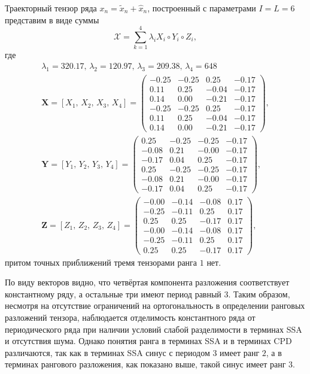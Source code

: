 \documentclass[specialist,
    substylefile = spbu_report.rtx,
    subf,href,colorlinks=true, 12pt]{disser}
\theoremstyle{plain}
\theoremstyle{definition}
\theoremstyle{remark}
\begin{document}
    Траекторный тензор ряда $x_n=\tilde{x}_n+\hat{x}_n$, построенный с параметрами $I=L=6$ представим в виде суммы
    \[
        \mathcal{X}=\sum_{k=1}^{4}\lambda_i X_i \circ Y_i\circ Z_i,
    \]
    где
    \begin{gather*}
        \lambda_1 =320.17,\, \lambda_2 =120.97,\, \lambda_3 =209.38,\, \lambda_4=648\\
        \mathbf{X}=[X_1,\, X_2,\, X_3,\, X_4] =
        \begin{pmatrix}
            -0.25 & -0.25 & 0.25  & -0.17 \\
            0.11  & 0.25  & -0.04 & -0.17 \\
            0.14  & 0.00  & -0.21 & -0.17 \\
            -0.25 & -0.25 & 0.25  & -0.17 \\
            0.11  & 0.25  & -0.04 & -0.17 \\
            0.14  & 0.00  & -0.21 & -0.17
        \end{pmatrix},\\
        \mathbf{Y}=[Y_1,\, Y_2,\, Y_3,\, Y_4] =
        \begin{pmatrix}
            0.25  & -0.25 & -0.25 & -0.17 \\
            -0.08 & 0.21  & -0.00 & -0.17 \\
            -0.17 & 0.04  & 0.25  & -0.17 \\
            0.25  & -0.25 & -0.25 & -0.17 \\
            -0.08 & 0.21  & -0.00 & -0.17 \\
            -0.17 & 0.04  & 0.25  & -0.17
        \end{pmatrix},\\
        \mathbf{Z}=[Z_1,\, Z_2,\, Z_3,\, Z_4] =
        \begin{pmatrix}
            -0.00 & -0.14 & -0.08 & 0.17 \\
            -0.25 & -0.11 & 0.25  & 0.17 \\
            0.25  & 0.25  & -0.17 & 0.17 \\
            -0.00 & -0.14 & -0.08 & 0.17 \\
            -0.25 & -0.11 & 0.25  & 0.17 \\
            0.25  & 0.25  & -0.17 & 0.17
        \end{pmatrix},
    \end{gather*}
    притом точных приближений тремя тензорами ранга $1$ нет.

    По виду векторов видно, что четвёртая компонента разложения соответствует константному ряду, а остальные три имеют период равный $3$.
    Таким образом, несмотря на отсутствие ограничений на ортогональность в определении ранговых разложений тензора, наблюдается
    отделимость константного ряда от периодического ряда при наличии условий слабой разделимости в терминах SSA и отсутствия
    шума.
    Однако понятия ранга в терминах SSA и в терминах CPD различаются, так как в терминах SSA синус с периодом $3$ имеет ранг $2$, а в
    терминах рангового разложения, как показано выше, такой синус имеет ранг $3$.
\end{document}
